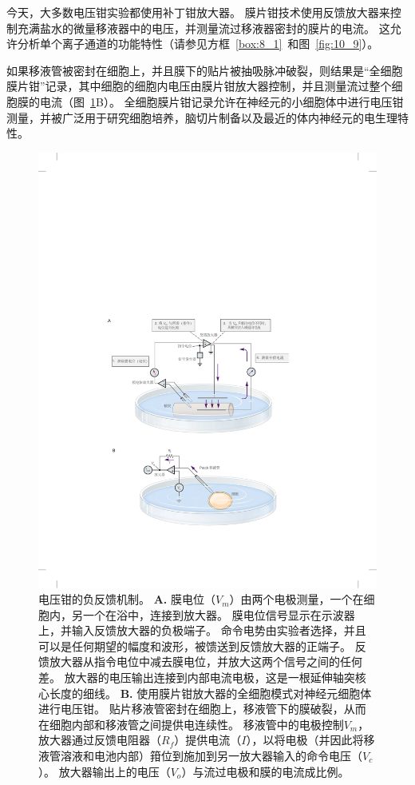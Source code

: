 \begin{proposition}[电压钳技术]
	\quad \quad 今天，大多数电压钳实验都使用补丁钳放大器。
	膜片钳技术使用反馈放大器来控制充满盐水的微量移液器中的电压，并测量流过移液器密封的膜片的电流。
	这允许分析单个离子通道的功能特性（请参见方框~\ref{box:8_1}~和图~\ref{fig:10_9}）。
	
	\quad \quad 如果移液管被密封在细胞上，并且膜下的贴片被抽吸脉冲破裂，则结果是“全细胞膜片钳”记录，其中细胞的细胞内电压由膜片钳放大器控制，并且测量流过整个细胞膜的电流（图~\ref{fig:10_2}B）。
	全细胞膜片钳记录允许在神经元的小细胞体中进行电压钳测量，并被广泛用于研究细胞培养，脑切片制备以及最近的体内神经元的电生理特性。
	
\end{proposition}



\begin{figure}[htbp]
	\centering
	\includegraphics[width=0.85\linewidth]{chap10/fig_10_2}
	\caption{电压钳的负反馈机制。
	\textbf{A. }膜电位（$V_m$）由两个电极测量，一个在细胞内，另一个在浴中，连接到放大器。
	膜电位信号显示在示波器上，并输入反馈放大器的负极端子。
	命令电势由实验者选择，并且可以是任何期望的幅度和波形，被馈送到反馈放大器的正端子。
	反馈放大器从指令电位中减去膜电位，并放大这两个信号之间的任何差。
	放大器的电压输出连接到内部电流电极，这是一根延伸轴突核心长度的细线。
	\textbf{B. }使用膜片钳放大器的全细胞模式对神经元细胞体进行电压钳。
	贴片移液管密封在细胞上，移液管下的膜破裂，从而在细胞内部和移液管之间提供电连续性。
	移液管中的电极控制$V_m$，放大器通过反馈电阻器（$R_f$）提供电流（$I$），以将电极（并因此将移液管溶液和电池内部）箝位到施加到另一放大器输入的命令电压（$V_c$）。
	放大器输出上的电压（$V_o$）与流过电极和膜的电流成比例。}
	\label{fig:10_2}
\end{figure}



